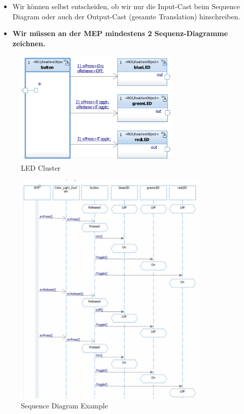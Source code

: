 \begin{itemize}
\tightlist
\item
  Wir können selbst entscheiden, ob wir nur die Input-Cast beim Sequence
  Diagram oder auch der Output-Cast (gesamte Translation) hinschreiben.
\item
  \textbf{Wir müssen an der MEP mindestens 2 Sequenz-Diagramme
  zeichnen.}
\end{itemize}

\begin{figure}[H]
\centering
\includegraphics[width=0.7\textwidth]{figures/LED-Cluster.png}
\caption{LED Cluster}
\end{figure}

\begin{figure}[H]
\centering
\includegraphics[width=0.82\textwidth]{figures/sequenceDiagramExample.png}
\caption{Sequence Diagram Example}
\end{figure}

